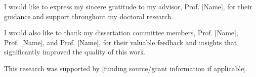 \begin{acknowledgments}
I would like to express my sincere gratitude to my advisor, Prof. [Name], for their guidance and support throughout my doctoral research.

I would also like to thank my dissertation committee members, Prof. [Name], Prof. [Name], and Prof. [Name], for their valuable feedback and insights that significantly improved the quality of this work.

This research was supported by [funding source/grant information if applicable].
\end{acknowledgments}